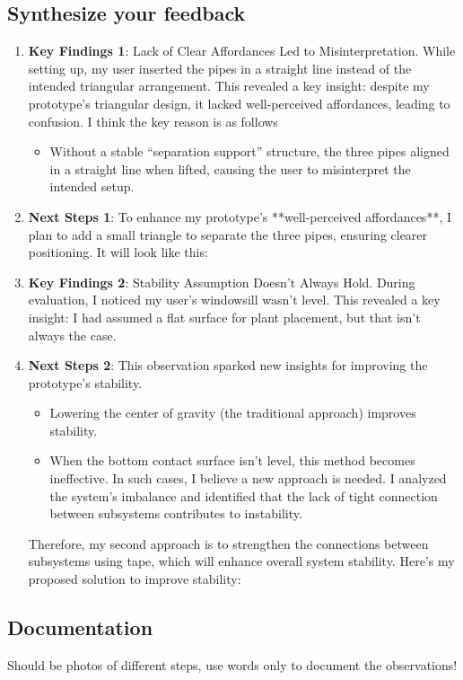 \documentclass[math,code]{amznotes}
\theoremstyle{remark}
\begin{document}
\subsection{Synthesize your feedback}
\begin{enumerate}
    \item \textbf{Key Findings 1}: Lack of Clear Affordances Led to Misinterpretation. While setting up, my user inserted the pipes in a straight line instead of the intended triangular arrangement. This revealed a key insight: despite my prototype’s triangular design, it lacked well-perceived affordances, leading to confusion. I think the key reason is as follows
    \begin{itemize}
        \item Without a stable ``separation support'' structure, the three pipes aligned in a straight line when lifted, causing the user to misinterpret the intended setup.
    \end{itemize}
    \item \textbf{Next Steps 1}: To enhance my prototype’s **well-perceived affordances**, I plan to add a small triangle to separate the three pipes, ensuring clearer positioning. It will look like this:
    \item \textbf{Key Findings 2}: Stability Assumption Doesn’t Always Hold. During evaluation, I noticed my user's windowsill wasn’t level. This revealed a key insight: I had assumed a flat surface for plant placement, but that isn’t always the case.
    \item \textbf{Next Steps 2}: This observation sparked new insights for improving the prototype’s stability.
    \begin{itemize}
        \item Lowering the center of gravity (the traditional approach) improves stability.
        \item When the bottom contact surface isn’t level, this method becomes ineffective. In such cases, I believe a new approach is needed. I analyzed the system's imbalance and identified that the lack of tight connection between subsystems contributes to instability.
    \end{itemize}
    Therefore, my second approach is to strengthen the connections between subsystems using tape, which will enhance overall system stability. Here's my proposed solution to improve stability:
\end{enumerate}
\subsection{Documentation}
Should be photos of different steps, use words only to document the observations!
\end{document}
